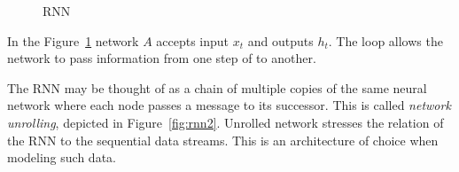 \begin{figure}[ht]
  \centering
  \caption{RNN}
  \label{fig:rnn1}  
\end{figure}

In the Figure~\ref{fig:rnn1} network $A$ accepts input $x_t$ and
outputs $h_t$.  The loop allows the network to pass information from
one step of to another.

The RNN may be thought of as a chain of multiple copies of the same
neural network where each node passes a message to its successor.
This is called \textit{network unrolling}, depicted in
Figure~\ref{fig:rnn2}.  Unrolled network stresses the relation of the
RNN to the sequential data streams.  This is an architecture of choice
when modeling such data.

